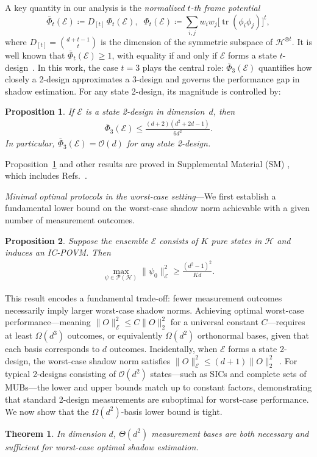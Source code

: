 \documentclass[aps,pra,twocolumn,nofootinbib,superscriptaddress,10pt]{revtex4-2}
\newtheorem{theorem}{Theorem}
\newtheorem{proposition}{Proposition}
\DeclareMathOperator{\tr}{tr}
\newcommand{\caE}{\mathcal{E}}
\newcommand{\caH}{\mathcal{H}}
\newcommand{\caO}{\mathcal{O}}
\newcommand{\caP}{\mathcal{P}}
\newcommand{\bPhi}{\bar{\Phi}}
\newcommand{\Pref}[1]{Proposition~\ref{#1}}
\newcommand{\rscite}[1]{Refs.~\cite{#1}}
\begin{document}
A key quantity in our analysis is the \emph{normalized $t$-th frame potential}
\begin{equation}\label{eq:FPt}
	\bPhi_t(\caE) \coloneqq D_{[t]}\,\Phi_t(\caE),\;\;
	\Phi_t(\caE) \coloneqq \sum_{i,j} w_i w_j \bigl[\tr(\phi_i\phi_j)\bigr]^t,
\end{equation}
where $D_{[t]}=\binom{d+t-1}{t}$ is the dimension of the symmetric
subspace of $\caH^{\otimes t}$. It is well known that
$\bPhi_t(\caE)\geq 1$, with equality if and only if $\caE$ forms a
state $t$-design~\cite{Renes04,Scott06,Ambainis07}. In this work, the case $t=3$ plays
the central role: $\bPhi_3(\caE)$ quantifies how closely a 2-design
approximates a 3-design and governs the performance gap in shadow
estimation. For any state 2-design, its magnitude is controlled by:
\begin{proposition}\label{pro:FP3UB}
	If $\caE$ is a state 2-design in dimension~$d$, then
	\begin{align}\label{eq:FP3UB}
		\bPhi_3(\caE)
		\leq \frac{(d+2)(d^2+2d-1)}{6d^2}.
	\end{align}
	In particular, $\bPhi_3(\caE)=\caO(d)$ for any state 2-design.
\end{proposition}
\Pref{pro:FP3UB} and other results are proved in Supplemental Material (SM) \cite{supp}, which includes \rscite{Hoggar82,Zhu16}.

	
\emph{Minimal optimal protocols in the worst-case setting}---We first establish a fundamental lower bound on the worst-case shadow norm achievable with a given number of measurement outcomes.
\begin{proposition}\label{pro:ShNormLUB}
	Suppose the ensemble $\caE$ consists of $K$ pure states in $\caH$ and induces an IC-POVM. Then
	\begin{align}\label{eq:ShNormLUB}
		\max_{\psi\in\caP(\caH)} \|\psi_0\|_\caE^2 \geq\frac{(d^2-1)^2}{Kd}.
	\end{align}
\end{proposition}
This result encodes a fundamental trade-off: fewer measurement outcomes necessarily imply larger worst-case shadow norms. Achieving optimal worst-case performance---meaning $\|O\|_\caE^2\leq C\|O\|_2^2$ for a universal constant $C$---requires at least $\Omega(d^3)$ outcomes, or equivalently $\Omega(d^2)$ orthonormal bases, given that each basis corresponds to $d$ outcomes. Incidentally, when $\caE$ forms a state 2-design, the worst-case shadow norm satisfies $\|O\|_\caE^2\leq (d+1)\|O\|_2^2$~\cite{InnocentiLP23,Zhang24,WangC24}. For typical 2-designs consisting of $\caO(d^2)$ states---such as SICs and complete sets of MUBs---the lower and upper bounds match up to constant factors, demonstrating that standard 2-design measurements are suboptimal for worst-case performance. We now show that the $\Omega(d^2)$-basis lower bound is tight.
\begin{theorem}\label{thm:MMSoptWC}
	In dimension $d$, $\Theta(d^2)$ measurement bases are both necessary and sufficient for worst-case optimal shadow estimation.
\end{theorem}
\end{document}
